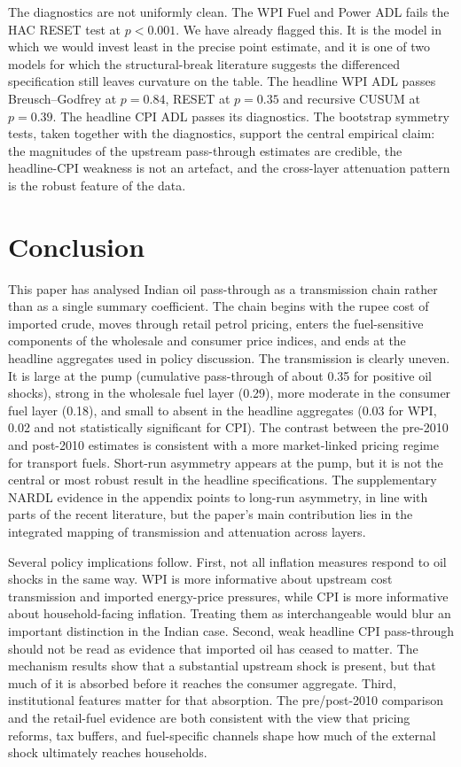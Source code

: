 \documentclass[11pt,a4paper]{article}
\begin{document}
The diagnostics are not uniformly clean. The WPI Fuel and Power ADL fails the HAC RESET test at $p < 0.001$. We have already flagged this. It is the model in which we would invest least in the precise point estimate, and it is one of two models for which the structural-break literature suggests the differenced specification still leaves curvature on the table. The headline WPI ADL passes Breusch--Godfrey at $p = 0.84$, RESET at $p = 0.35$ and recursive CUSUM at $p = 0.39$. The headline CPI ADL passes its diagnostics. The bootstrap symmetry tests, taken together with the diagnostics, support the central empirical claim: the magnitudes of the upstream pass-through estimates are credible, the headline-CPI weakness is not an artefact, and the cross-layer attenuation pattern is the robust feature of the data.

\section{Conclusion}
\label{sec:conc}

This paper has analysed Indian oil pass-through as a transmission chain rather than as a single summary coefficient. The chain begins with the rupee cost of imported crude, moves through retail petrol pricing, enters the fuel-sensitive components of the wholesale and consumer price indices, and ends at the headline aggregates used in policy discussion. The transmission is clearly uneven. It is large at the pump (cumulative pass-through of about 0.35 for positive oil shocks), strong in the wholesale fuel layer (0.29), more moderate in the consumer fuel layer (0.18), and small to absent in the headline aggregates (0.03 for WPI, 0.02 and not statistically significant for CPI). The contrast between the pre-2010 and post-2010 estimates is consistent with a more market-linked pricing regime for transport fuels. Short-run asymmetry appears at the pump, but it is not the central or most robust result in the headline specifications. The supplementary NARDL evidence in the appendix points to long-run asymmetry, in line with parts of the recent literature, but the paper's main contribution lies in the integrated mapping of transmission and attenuation across layers.

Several policy implications follow. First, not all inflation measures respond to oil shocks in the same way. WPI is more informative about upstream cost transmission and imported energy-price pressures, while CPI is more informative about household-facing inflation. Treating them as interchangeable would blur an important distinction in the Indian case. Second, weak headline CPI pass-through should not be read as evidence that imported oil has ceased to matter. The mechanism results show that a substantial upstream shock is present, but that much of it is absorbed before it reaches the consumer aggregate. Third, institutional features matter for that absorption. The pre/post-2010 comparison and the retail-fuel evidence are both consistent with the view that pricing reforms, tax buffers, and fuel-specific channels shape how much of the external shock ultimately reaches households.
\end{document}
